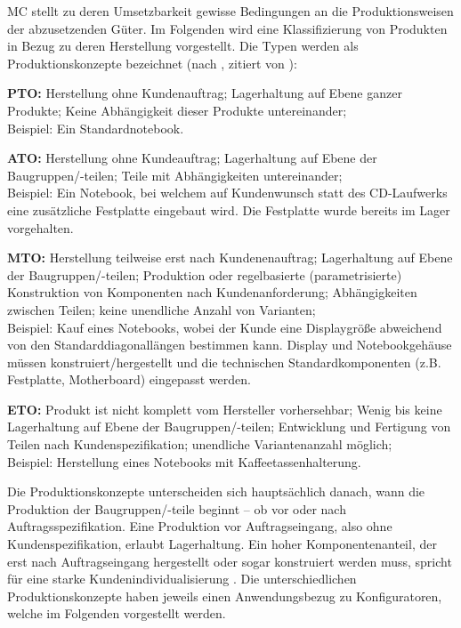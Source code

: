 \documentclass[12pt,a4paper,bibliography=totocnumbered,listof=totoc]{scrartcl}
\begin{document}
\ac{MC} stellt zu deren Umsetzbarkeit gewisse Bedingungen an die Produktionsweisen der abzusetzenden Güter. Im Folgenden wird eine Klassifizierung von Produkten in Bezug zu deren Herstellung vorgestellt. Die Typen werden als Produktionskonzepte bezeichnet  (nach \citealt{schuh06}, zitiert von \citealt{lutz11}):
\begin{compactitem}
	\item \textbf{\ac{PTO}:} Herstellung ohne Kundenauftrag; Lagerhaltung auf Ebene ganzer Produkte; Keine Abhängigkeit dieser Produkte untereinander;\\
	Beispiel: Ein Standardnotebook.
	\item \textbf{\ac{ATO}:} Herstellung ohne Kundeauftrag; Lagerhaltung auf Ebene der Baugruppen/-teilen; Teile mit Abhängigkeiten untereinander;\\
	Beispiel: Ein Notebook, bei welchem auf Kundenwunsch statt des CD-Laufwerks eine zusätzliche Festplatte eingebaut wird. Die Festplatte wurde bereits im Lager vorgehalten.
	\item \textbf{\ac{MTO}:} Herstellung teilweise erst nach Kundenenauftrag; Lagerhaltung auf Ebene der Baugruppen/-teilen; Produktion oder regelbasierte (parametrisierte) Konstruktion von Komponenten nach Kundenanforderung; Abhängigkeiten zwischen Teilen; keine unendliche Anzahl von Varianten;\\
		Beispiel: Kauf eines Notebooks, wobei der Kunde eine Displaygröße abweichend von den Standarddiagonallängen bestimmen kann. Display und Notebookgehäuse müssen konstruiert/hergestellt und die technischen Standardkomponenten (z.B. Festplatte, Motherboard) eingepasst werden. 
	\item \textbf{\ac{ETO}:} Produkt ist nicht komplett vom Hersteller vorhersehbar; Wenig bis keine Lagerhaltung auf Ebene der Baugruppen/-teilen; Entwicklung und Fertigung von Teilen nach Kundenspezifikation; unendliche Variantenanzahl möglich;\\
	Beispiel: Herstellung eines Notebooks mit Kaffeetassenhalterung.
\end{compactitem}

Die Produktionskonzepte unterscheiden sich hauptsächlich danach, wann die Produktion der Baugruppen/-teile beginnt -- ob vor oder nach Auftragsspezifikation. Eine Produktion vor Auftragseingang, also ohne Kundenspezifikation, erlaubt Lagerhaltung. Ein hoher Komponentenanteil, der erst nach Auftragseingang hergestellt oder sogar konstruiert werden muss, spricht für eine starke Kundenindividualisierung \citep{lutz11}. Die unterschiedlichen Produktionskonzepte haben jeweils einen Anwendungsbezug zu Konfiguratoren, welche im Folgenden vorgestellt werden.
\end{document}
